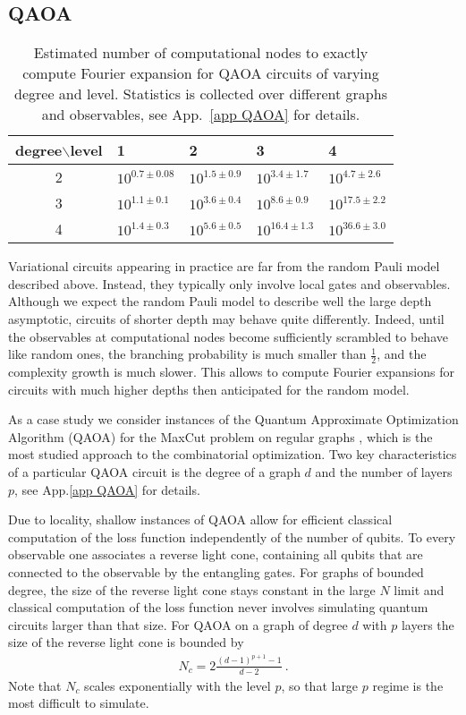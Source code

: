 \documentclass[twocolumn, amsfonts, amssymb, aps, nofootinbib]{revtex4-2}
\begin{document}
\subsection{QAOA}
\begin{table}
	\begin{tabular}{cllll}
		\toprule
		degree$\backslash$level&  1 & 2 & 3 & 4\\ \hline
		2  &$10^{0.7\pm0.08}$  &$10^{1.5\pm0.9}$  &$10^{3.4\pm1.7}$ & $10^{4.7\pm 2.6}$ \\
		3  &$10^{1.1\pm0.1}$  &$10^{3.6\pm0.4}$ &$10^{8.6\pm0.9}$ & $10^{17.5\pm 2.2}$  \\ 
		4  &$10^{1.4\pm0.3}$  &$10^{5.6\pm0.5}$ &$10^{16.4\pm1.3}$ & $10^{36.6\pm 3.0}$ \\
		\bottomrule
	\end{tabular}
	\caption{Estimated number of computational nodes to exactly compute Fourier expansion for QAOA circuits of varying degree and level. Statistics is collected over different graphs and observables, see App.~\ref{app QAOA} for details.}
	\label{tab QAOA}
\end{table}

Variational circuits appearing in practice are far from the random Pauli model described above. Instead, they typically only involve local gates and observables. Although we expect the random Pauli model to describe well the large depth asymptotic, circuits of shorter depth may behave quite differently. Indeed, until the observables at computational nodes become sufficiently scrambled to behave like random ones, the branching probability is much smaller than $\frac12$, and the complexity growth is much slower. This allows to compute Fourier expansions for circuits with much higher depths then anticipated for the random model.

As a case study we consider instances of the Quantum Approximate Optimization Algorithm (QAOA) for the MaxCut problem on regular graphs \cite{Farhi2014}, which is the most studied approach to the combinatorial optimization. Two key characteristics of a particular QAOA circuit is the degree of a graph $d$ and the number of layers $p$, see App.\ref{app QAOA} for details. 

Due to locality, shallow instances of QAOA allow for efficient classical computation of the loss function independently of the number of qubits. To every observable one associates a reverse light cone, containing all qubits that are connected to the observable by the entangling gates. For graphs of bounded degree, the size of the reverse light cone stays constant in the large $N$ limit and classical computation of the loss function never involves simulating quantum circuits larger than that size. For 
QAOA on a graph of degree $d$ with $p$ layers the size of the reverse light cone is bounded by \cite{Farhi2014}
\begin{align}
	N_c=2\frac{(d-1)^{p+1}-1}{d-2} \ . \label{q QAOA}
\end{align}
Note that $N_c$ scales exponentially with the level $p$, so that large $p$ regime is the most difficult to simulate. 
\end{document}
